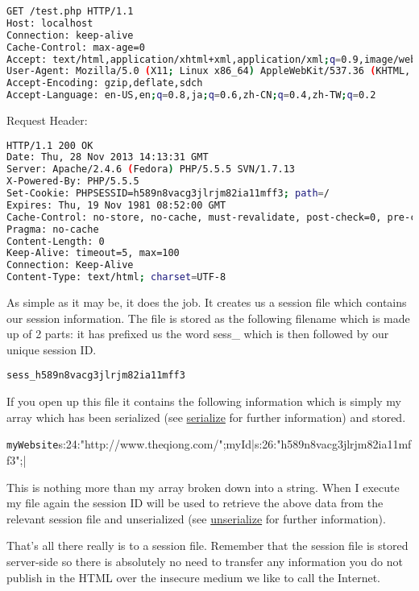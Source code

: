 \begin{lstlisting}[language=bash]
GET /test.php HTTP/1.1
Host: localhost
Connection: keep-alive
Cache-Control: max-age=0
Accept: text/html,application/xhtml+xml,application/xml;q=0.9,image/webp,*/*;q=0.8
User-Agent: Mozilla/5.0 (X11; Linux x86_64) AppleWebKit/537.36 (KHTML, like Gecko) Chrome/31.0.1650.57 Safari/537.36
Accept-Encoding: gzip,deflate,sdch
Accept-Language: en-US,en;q=0.8,ja;q=0.6,zh-CN;q=0.4,zh-TW;q=0.2
\end{lstlisting}

Request Header:

\begin{lstlisting}[language=bash]
HTTP/1.1 200 OK
Date: Thu, 28 Nov 2013 14:13:31 GMT
Server: Apache/2.4.6 (Fedora) PHP/5.5.5 SVN/1.7.13
X-Powered-By: PHP/5.5.5
Set-Cookie: PHPSESSID=h589n8vacg3jlrjm82ia11mff3; path=/
Expires: Thu, 19 Nov 1981 08:52:00 GMT
Cache-Control: no-store, no-cache, must-revalidate, post-check=0, pre-check=0
Pragma: no-cache
Content-Length: 0
Keep-Alive: timeout=5, max=100
Connection: Keep-Alive
Content-Type: text/html; charset=UTF-8
\end{lstlisting}

As simple as it may be, it does the job. It creates us a session file which contains our session information. The file is stored as the following filename which is made up of 2 parts: it has prefixed us the word sess\_ which is then followed by our unique session ID.

\verb|sess_h589n8vacg3jlrjm82ia11mff3|

If you open up this file it contains the following information which is simply my array which has been serialized (see \href{http://www.php.net/serialize}{serialize} for further information) and stored.

\verb|myWebsite|s:24:"http://www.theqiong.com/";myId|s:26:"h589n8vacg3jlrjm82ia11mff3";|

This is nothing more than my array broken down into a string. When I execute my file again the session ID will be used to retrieve the above data from the relevant session file and unserialized (see \href{http://www.php.net/unserialize}{unserialize} for further information).

That's all there really is to a session file. Remember that the session file is stored server-side so there is absolutely no need to transfer any information you do not publish in the HTML over the insecure medium we like to call the Internet.




